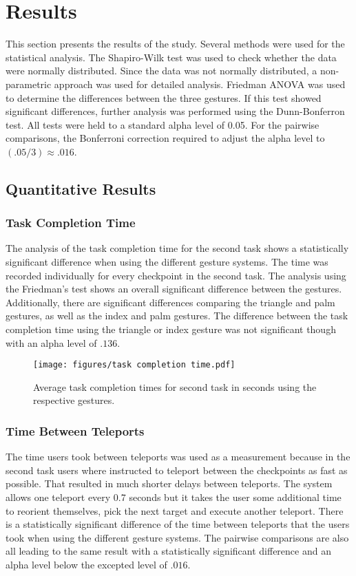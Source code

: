 \section{Results}
This section presents the results of the study. Several methods were used for the statistical analysis. The Shapiro-Wilk test was used to check whether the data were normally distributed. Since the data was not normally distributed, a non-parametric approach was used for detailed analysis. Friedman ANOVA was used to determine the differences between the three gestures. If this test showed significant differences, further analysis was performed using the Dunn-Bonferron test. All tests were held to a standard alpha level of 0.05. For the
pairwise comparisons, the Bonferroni correction required to adjust the alpha level to $(.05/3) \approx .016$.

\subsection{Quantitative Results}

\subsubsection{Task Completion Time}
The analysis of the task completion time for the second task shows a statistically significant difference when using the different gesture systems. The time was recorded individually for every checkpoint in the second task. The analysis using the Friedman’s test shows an overall significant difference between the gestures. Additionally, there are significant differences comparing the triangle and palm gestures, as well as the index and palm gestures. The difference between the task completion time using the triangle or index gesture was not significant though with an alpha level of $.136$.

\begin{figure}[!ht]
    \centering
    \texttt{[image: figures/task completion time.pdf]}
    \caption{Average task completion times for second task in seconds using the respective gestures.}
    \label{fig:ueqIndex}
\end{figure}

\subsubsection{Time Between Teleports}
The time users took between teleports was used as a measurement because in the second task users where instructed to teleport between the checkpoints as fast as possible. That resulted in much shorter delays between teleports. The system allows one teleport every 0.7 seconds but it takes the user some additional time to reorient themselves, pick the next target and execute another teleport. There is a statistically significant difference of the time between teleports that the users took when using the different gesture systems. The pairwise comparisons are also all leading to the same result with a statistically significant difference and an alpha level below the excepted level of $.016$. 

